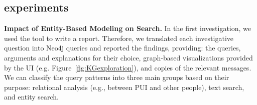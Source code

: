 
\subsection{experiments}

\textbf{Impact of Entity-Based Modeling on Search.} 
In the first investigation, we used the tool to write a report. Therefore, we translated each investigative question into Neo4j queries and reported the findings, providing: the queries, arguments and explanations for their choice, graph-based visualizations provided by the UI (e.g. Figure~\ref{fig:KGexploration}), and copies of the relevant messages. We can classify the query patterns into three main groups based on their purpose: relational analysis (e.g., between PUI and other people), text search, and entity search.  


